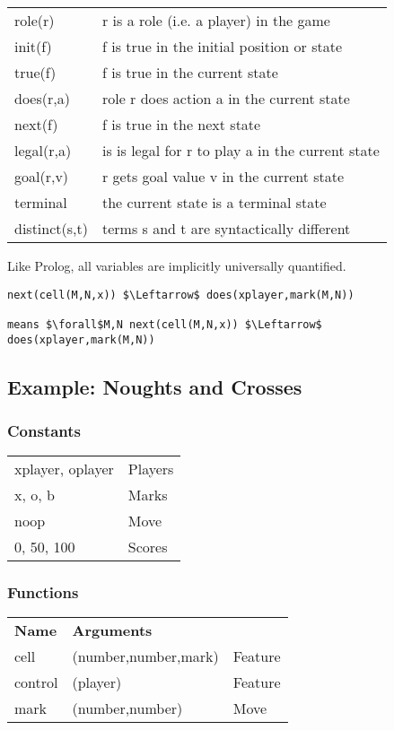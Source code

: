 \begin{tabular}{ l l }
    role(r)       & r is a role (i.e. a player) in the game\\
    init(f)       & f is true in the initial position or state\\
    true(f)       & f is true in the current state\\
    does(r,a)     & role r does action a in the current state\\
    next(f)       & f is true in the next state\\
    legal(r,a)    & is is legal for r to play a in the current state\\
    goal(r,v)     & r gets goal value v in the current state\\
    terminal      & the current state is a terminal state\\
    distinct(s,t) & terms s and t are syntactically different\\
\end{tabular}

Like Prolog, all variables are implicitly universally quantified.

\begin{lstlisting}[morekeywords={next, does}]
next(cell(M,N,x)) $\Leftarrow$ does(xplayer,mark(M,N))

means $\forall$M,N next(cell(M,N,x)) $\Leftarrow$ does(xplayer,mark(M,N))
\end{lstlisting}

\subsection{Example: Noughts and Crosses}
\subsubsection{Constants}
\begin{tabular}{ l l }
    xplayer, oplayer & Players\\
    x, o, b          & Marks\\
    noop             & Move\\
    0, 50, 100       & Scores\\
\end{tabular}

\subsubsection{Functions}
\begin{tabular}{ l l l }
    \textbf{Name} & \textbf{Arguments}\\
    cell          & (number,number,mark) & Feature\\
    control       & (player)             & Feature\\
    mark          & (number,number)      & Move\\
\end{tabular}

